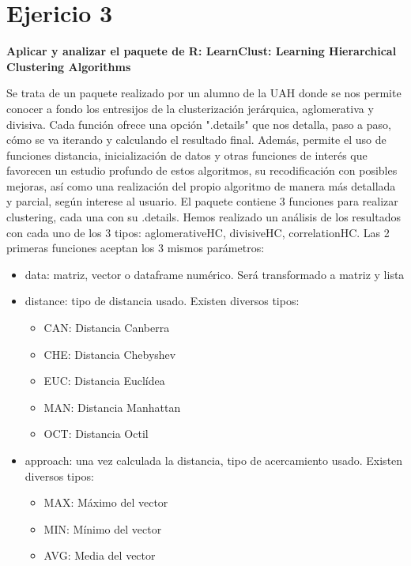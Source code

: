 \documentclass[a4paper]{article}
\begin{document}
\newpage
\section{Ejericio 3}
\textbf{Aplicar y analizar el paquete de R: LearnClust: Learning Hierarchical Clustering Algorithms}

Se trata de un paquete realizado por un alumno de la UAH donde se nos permite conocer a fondo los entresijos de la clusterización jerárquica, aglomerativa y divisiva.
Cada función ofrece una opción ".details" que nos detalla, paso a paso, cómo se va iterando y calculando el resultado final. Además, permite el uso de funciones distancia, inicialización de datos y otras funciones de interés que favorecen un estudio profundo de estos algoritmos, su recodificación con posibles mejoras, así como una realización del propio algoritmo de manera más detallada y parcial, según interese al usuario.
El paquete contiene 3 funciones para realizar clustering, cada una con su .details. Hemos realizado un análisis de los resultados con cada uno de los 3 tipos: aglomerativeHC, divisiveHC, correlationHC.
Las 2 primeras funciones aceptan los 3 mismos parámetros:
\begin{itemize}
     \item data: matriz, vector o dataframe numérico. Será transformado a matriz y lista
     \item distance: tipo de distancia usado. Existen diversos tipos:
      \begin{itemize}
          \item CAN: Distancia Canberra
          \item CHE: Distancia Chebyshev
          \item EUC: Distancia Euclídea 
          \item MAN: Distancia Manhattan 
          \item OCT: Distancia Octil
      \end{itemize}
     \item approach: una vez calculada la distancia, tipo de acercamiento usado. Existen diversos tipos:
      \begin{itemize}
          \item MAX: Máximo del vector
          \item MIN: Mínimo del vector
          \item AVG: Media del vector
      \end{itemize}
\end{itemize}
\end{document}
